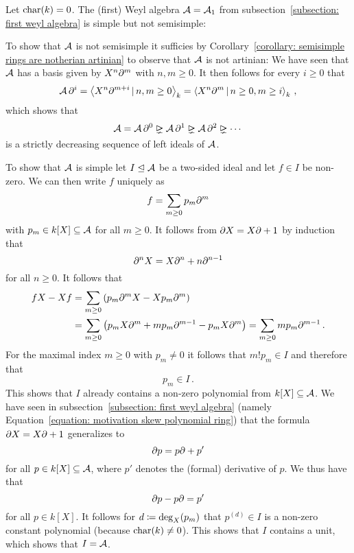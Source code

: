 \begin{example}
  \label{example: simple but not semisimple}
  Let $\operatorname{char}(k) = 0$.
  The (first) Weyl algebra $\operatorname{\mathcal{A}} = \operatorname{\mathcal{A}}_1$ from subsection~\ref{subsection: first weyl algebra} is simple but not semisimple:
  
  To show that $\operatorname{\mathcal{A}}$ is not semisimple it sufficies by Corollary~\ref{corollary: semisimple rings are notherian artinian} to observe that $\operatorname{\mathcal{A}}$ is not artinian:
  We have seen that $\operatorname{\mathcal{A}}$ has a basis given by $X^n \partial^m$ with $n, m \geq 0$.
  It then follows for every $i \geq 0$ that
  \[
      \weyl \del^i
    = \gen{ X^n \del^{m+i} \suchthat n, m \geq 0 }_k
    = \gen{ X^n \del^m \suchthat n \geq 0, m \geq i }_k  \,,
  \]
  which shows that
  \[
                \weyl
    =           \weyl \del^0
    \idealgneq  \weyl \del^1
    \idealgneq  \weyl \del^2
    \idealgneq  \dotsb
  \]
  is a strictly decreasing sequence of left ideals of $\operatorname{\mathcal{A}}$.
  
  To show that $\operatorname{\mathcal{A}}$ is simple let $I \trianglelefteq \operatorname{\mathcal{A}}$ be a two-sided ideal and let $f \in I$ be non-zero.
  We can then write $f$ uniquely as
  \[
      f
    = \sum_{m \geq 0} p_m \partial^m
  \]
  with $p_m \in k[X] \subseteq \operatorname{\mathcal{A}}$ for all $m \geq 0$.
  It follows from $\partial X = X \partial + 1$ by induction that 
  \[
      \partial^n X
    = X \partial^n + n \partial^{n-1}
  \]
  for all $n \geq 0$.
  It follows that
  \begin{align*}
        f X - X f
    &=  \sum_{m \geq 0} \left( p_m \partial^m X - X p_m \partial^m \right)  \\
    &=  \sum_{m \geq 0} \left( p_m X \partial^m + m p_m \partial^{m-1} - p_m X \partial^m \right)
     =  \sum_{m \geq 0} m p_m \partial^{m-1} \,.
  \end{align*}
  For the maximal index $m \geq 0$ with $p_m \neq 0$ it follows that $m! p_m \in I$ and therefore that
  \[
    p_m \in I \,.
  \]
  This shows that $I$ already contains a non-zero polynomial from $k[X] \subseteq \operatorname{\mathcal{A}}$.
  We have seen in subsection~\ref{subsection: first weyl algebra} (namely Equation~\eqref{equation: motivation skew polynomial ring}) that the formula $\partial X = X \partial + 1$ generalizes to
  \[
    \partial p = p \partial + p'
  \]
  for all $p \in k[X] \subseteq \operatorname{\mathcal{A}}$, where $p'$ denotes the (formal) derivative of $p$.
  We thus have that
  \[
      \partial p - p \partial
    = p'
  \]
  for all $p \in k[X]$.
  It follows for $d \coloneqq \deg_X(p_m)$ that $p^{(d)} \in I$ is a non-zero constant polynomial (because $\operatorname{char}(k) \neq 0$).
  This shows that $I$ contains a unit, which shows that $I = \operatorname{\mathcal{A}}$.
\end{example}



